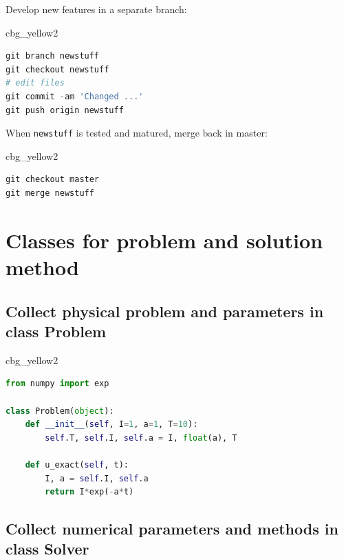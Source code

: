 \documentclass[%
oneside,                 %
final,                   %
10pt]{article}
\newenvironment{_cod_tight}[1]{
   \def\FrameCommand{\colorbox{#1}}
   \FrameRule0.6pt\MakeFramed {\FrameRestore}\vskip3mm}
   {\vskip0mm\endMakeFramed}
\newenvironment{cod}[1]{
\bgroup\rmfamily
\fboxsep=0mm\relax
\begin{_cod_tight}{#1}
\list{}{\parsep=-2mm\parskip=0mm\topsep=0pt\leftmargin=2mm
\rightmargin=2\leftmargin\leftmargin=4pt\relax}
\item\relax}
{\endlist\end{_cod_tight}\egroup}
\begin{document}
Develop new features in a separate branch:

\begin{cod}{cbg_yellow2}\begin{lstlisting}[language=Python,style=simple,xleftmargin=2mm]
git branch newstuff
git checkout newstuff
# edit files
git commit -am 'Changed ...'
git push origin newstuff
\end{lstlisting}\end{cod}
\noindent
When \texttt{newstuff} is tested and matured, merge back in master:

\begin{cod}{cbg_yellow2}\begin{lstlisting}[language=Python,style=simple,xleftmargin=2mm]
git checkout master
git merge newstuff
\end{lstlisting}\end{cod}
\noindent



\section*{Classes for problem and solution method}
\label{softeng1:prog:se:class}

\subsection*{Collect physical problem and parameters in class Problem}

\begin{cod}{cbg_yellow2}\begin{lstlisting}[language=Python,style=simple,xleftmargin=2mm]
from numpy import exp

class Problem(object):
    def __init__(self, I=1, a=1, T=10):
        self.T, self.I, self.a = I, float(a), T

    def u_exact(self, t):
        I, a = self.I, self.a
        return I*exp(-a*t)
\end{lstlisting}\end{cod}
\noindent

\subsection*{Collect numerical parameters and methods in class Solver}
\end{document}

